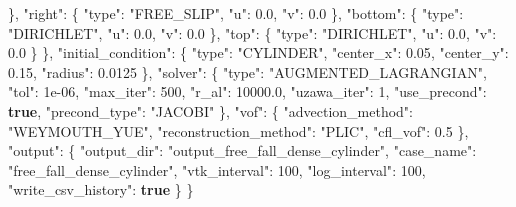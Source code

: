 \documentclass[
  10pt,
]{article}
\newenvironment{Shaded}{}{}
\newcommand{\DataTypeTok}[1]{\textcolor[rgb]{0.56,0.13,0.00}{#1}}
\newcommand{\DecValTok}[1]{\textcolor[rgb]{0.25,0.63,0.44}{#1}}
\newcommand{\FloatTok}[1]{\textcolor[rgb]{0.25,0.63,0.44}{#1}}
\newcommand{\FunctionTok}[1]{\textcolor[rgb]{0.02,0.16,0.49}{#1}}
\newcommand{\KeywordTok}[1]{\textcolor[rgb]{0.00,0.44,0.13}{\textbf{#1}}}
\newcommand{\StringTok}[1]{\textcolor[rgb]{0.25,0.44,0.63}{#1}}
\begin{document}
\begin{Shaded}
\begin{Highlighting}[]
    \FunctionTok{\},}
    \DataTypeTok{"right"}\FunctionTok{:} \FunctionTok{\{}
      \DataTypeTok{"type"}\FunctionTok{:} \StringTok{"FREE\_SLIP"}\FunctionTok{,}
      \DataTypeTok{"u"}\FunctionTok{:} \FloatTok{0.0}\FunctionTok{,}
      \DataTypeTok{"v"}\FunctionTok{:} \FloatTok{0.0}
    \FunctionTok{\},}
    \DataTypeTok{"bottom"}\FunctionTok{:} \FunctionTok{\{}
      \DataTypeTok{"type"}\FunctionTok{:} \StringTok{"DIRICHLET"}\FunctionTok{,}
      \DataTypeTok{"u"}\FunctionTok{:} \FloatTok{0.0}\FunctionTok{,}
      \DataTypeTok{"v"}\FunctionTok{:} \FloatTok{0.0}
    \FunctionTok{\},}
    \DataTypeTok{"top"}\FunctionTok{:} \FunctionTok{\{}
      \DataTypeTok{"type"}\FunctionTok{:} \StringTok{"DIRICHLET"}\FunctionTok{,}
      \DataTypeTok{"u"}\FunctionTok{:} \FloatTok{0.0}\FunctionTok{,}
      \DataTypeTok{"v"}\FunctionTok{:} \FloatTok{0.0}
    \FunctionTok{\}}
  \FunctionTok{\},}
  \DataTypeTok{"initial\_condition"}\FunctionTok{:} \FunctionTok{\{}
    \DataTypeTok{"type"}\FunctionTok{:} \StringTok{"CYLINDER"}\FunctionTok{,}
    \DataTypeTok{"center\_x"}\FunctionTok{:} \FloatTok{0.05}\FunctionTok{,}
    \DataTypeTok{"center\_y"}\FunctionTok{:} \FloatTok{0.15}\FunctionTok{,}
    \DataTypeTok{"radius"}\FunctionTok{:} \FloatTok{0.0125}
  \FunctionTok{\},}
  \DataTypeTok{"solver"}\FunctionTok{:} \FunctionTok{\{}
    \DataTypeTok{"type"}\FunctionTok{:} \StringTok{"AUGMENTED\_LAGRANGIAN"}\FunctionTok{,}
    \DataTypeTok{"tol"}\FunctionTok{:} \DecValTok{1e{-}06}\FunctionTok{,}
    \DataTypeTok{"max\_iter"}\FunctionTok{:} \DecValTok{500}\FunctionTok{,}
    \DataTypeTok{"r\_al"}\FunctionTok{:} \FloatTok{10000.0}\FunctionTok{,}
    \DataTypeTok{"uzawa\_iter"}\FunctionTok{:} \DecValTok{1}\FunctionTok{,}
    \DataTypeTok{"use\_precond"}\FunctionTok{:} \KeywordTok{true}\FunctionTok{,}
    \DataTypeTok{"precond\_type"}\FunctionTok{:} \StringTok{"JACOBI"}
  \FunctionTok{\},}
  \DataTypeTok{"vof"}\FunctionTok{:} \FunctionTok{\{}
    \DataTypeTok{"advection\_method"}\FunctionTok{:} \StringTok{"WEYMOUTH\_YUE"}\FunctionTok{,}
    \DataTypeTok{"reconstruction\_method"}\FunctionTok{:} \StringTok{"PLIC"}\FunctionTok{,}
    \DataTypeTok{"cfl\_vof"}\FunctionTok{:} \FloatTok{0.5}
  \FunctionTok{\},}
  \DataTypeTok{"output"}\FunctionTok{:} \FunctionTok{\{}
    \DataTypeTok{"output\_dir"}\FunctionTok{:} \StringTok{"output\_free\_fall\_dense\_cylinder"}\FunctionTok{,}
    \DataTypeTok{"case\_name"}\FunctionTok{:} \StringTok{"free\_fall\_dense\_cylinder"}\FunctionTok{,}
    \DataTypeTok{"vtk\_interval"}\FunctionTok{:} \DecValTok{100}\FunctionTok{,}
    \DataTypeTok{"log\_interval"}\FunctionTok{:} \DecValTok{100}\FunctionTok{,}
    \DataTypeTok{"write\_csv\_history"}\FunctionTok{:} \KeywordTok{true}
  \FunctionTok{\}}
\FunctionTok{\}}
\end{Highlighting}
\end{Shaded}
\end{document}
